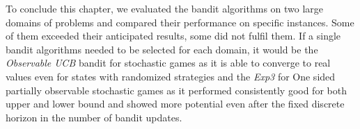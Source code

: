 \documentclass[../main.tex]{subfiles}
\begin{document}
To conclude this chapter, we evaluated the bandit algorithms on two large domains of problems and compared their performance on specific instances.
Some of them exceeded their anticipated results, some did not fulfil them.
If a single bandit algorithms needed to be selected for each domain, it would be the \textit{Observable UCB} bandit for stochastic games as it is able to converge to real values even for states with randomized strategies and the \textit{Exp3} for One sided partially observable stochastic games as it performed consistently good for both upper and lower bound and showed more potential even after the fixed discrete horizon in the number of bandit updates.
\end{document}
